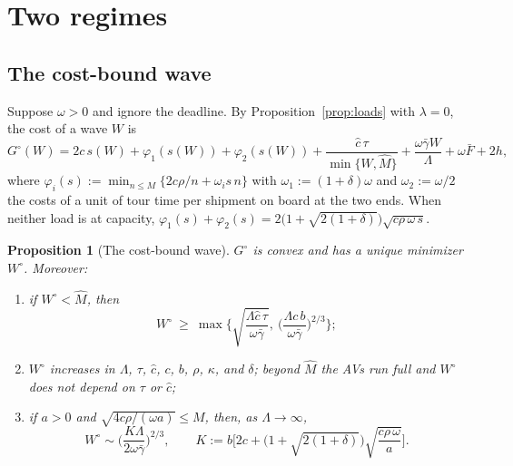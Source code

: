 \documentclass[10pt, reqno]{amsart}
\newtheorem{proposition}{Proposition}
\theoremstyle{definition}
\begin{document}
\section{Two regimes}

\subsection{The cost-bound wave}

Suppose $\omega>0$ and ignore the deadline. By Proposition~\ref{prop:loads} with $\lambda=0$, the cost of a wave $W$ is
\begin{equation}\label{eq:G0}
G^\circ(W)=2c\,s(W)+\varphi_1(s(W))+\varphi_2(s(W))+\frac{\hat c\,\tau}{\min\{W,\hat M\}}+\frac{\omega\bar\gamma W}{\Lambda}+\omega\bar F+2h,
\end{equation}
where $\varphi_i(s):=\min_{n\le M}\{2c\rho/n+\omega_i s\,n\}$ with $\omega_1:=(1+\delta)\omega$ and $\omega_2:=\omega/2$ the costs of a unit of tour time per shipment on board at the two ends. When neither load is at capacity, $\varphi_1(s)+\varphi_2(s)=2\big(1+\sqrt{2(1+\delta)}\big)\sqrt{c\rho\,\omega\,s}$.

\begin{proposition}[The cost-bound wave]\label{prop:cost}
$G^\circ$ is convex and has a unique minimizer $W^\circ$. Moreover:
\begin{enumerate}
\item if $W^\circ<\hat M$, then
\begin{equation}\label{eq:wavebounds}
W^\circ\ \ge\ \max\Big\{\sqrt{\frac{\Lambda\hat c\,\tau}{\omega\bar\gamma}},\ \Big(\frac{\Lambda c\,b}{\omega\bar\gamma}\Big)^{2/3}\Big\};
\end{equation}
\item $W^\circ$ increases in $\Lambda$, $\tau$, $\hat c$, $c$, $b$, $\rho$, $\kappa$, and $\delta$; beyond $\hat M$ the AVs run full and $W^\circ$ does not depend on $\tau$ or $\hat c$;
\item if $a>0$ and $\sqrt{4c\rho/(\omega a)}\le M$, then, as $\Lambda\to\infty$,
\begin{equation}\label{eq:asym}
W^\circ\sim\Big(\frac{K\Lambda}{2\omega\bar\gamma}\Big)^{2/3},\qquad K:=b\Big[2c+\Big(1+\sqrt{2(1+\delta)}\Big)\sqrt{\frac{c\rho\,\omega}{a}}\Big].
\end{equation}
\end{enumerate}
\end{proposition}
\end{document}

